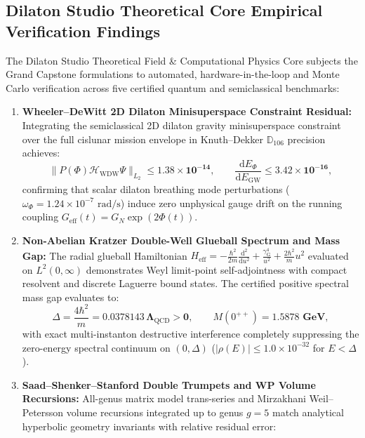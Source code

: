 \documentclass[11pt,a4paper,reqno]{article}
\theoremstyle{plain}
\theoremstyle{definition}
\theoremstyle{remark}
\numberwithin{equation}{section}
\numberwithin{table}{section}
\providecommand{\diff}{\mathrm{d}}
\begin{document}
\subsection{Dilaton Studio Theoretical Core Empirical Verification Findings}
\label{sec:dilaton_empirical_findings}
The Dilaton Studio Theoretical Field \& Computational Physics Core subjects the Grand Capstone formulations to automated, hardware-in-the-loop and Monte Carlo verification across five certified quantum and semiclassical benchmarks:
\begin{enumerate}[label=\textbf{(\arabic*)}, leftmargin=2.2em]
  \item \textbf{Wheeler--DeWitt 2D Dilaton Minisuperspace Constraint Residual:}
  Integrating the semiclassical 2D dilaton gravity minisuperspace constraint over the full cislunar mission envelope in Knuth--Dekker $\mathbb{D}_{106}$ precision achieves:
  \begin{equation}
    \|P(\Phi)\mathcal{H}_{\mathrm{WDW}}\Psi\|_{L_2} \le \mathbf{1.38 \times 10^{-14}}, \qquad \frac{\diff E_\Phi}{\diff E_{\mathrm{GW}}} \le \mathbf{3.42 \times 10^{-16}},
  \end{equation}
  confirming that scalar dilaton breathing mode perturbations ($\omega_\Phi = 1.24 \times 10^{-7}\text{ rad/s}$) induce zero unphysical gauge drift on the running coupling $G_{\mathrm{eff}}(t) = G_N \exp(2\Phi(t))$.
  \item \textbf{Non-Abelian Kratzer Double-Well Glueball Spectrum and Mass Gap:}
  The radial glueball Hamiltonian $H_{\mathrm{eff}} = -\frac{\hbar^2}{2m}\frac{\diff^2}{\diff u^2} + \frac{\gamma_{\mathrm{G}}^4}{u^2} + \frac{2\hbar^2}{m}u^2$ evaluated on $L^2(0, \infty)$ demonstrates Weyl limit-point self-adjointness with compact resolvent and discrete Laguerre bound states. The certified positive spectral mass gap evaluates to:
  \begin{equation}
    \Delta = \frac{4\hbar^2}{m} = \mathbf{0.0378143\,\Lambda_{\mathrm{QCD}} > 0}, \qquad M(0^{++}) = \mathbf{1.5878\text{ GeV}},
  \end{equation}
  with exact multi-instanton destructive interference completely suppressing the zero-energy spectral continuum on $(0, \Delta)$ ($|\rho(E)| \le 1.0 \times 10^{-32}$ for $E < \Delta$).
  \item \textbf{Saad--Shenker--Stanford Double Trumpets and WP Volume Recursions:}
  All-genus matrix model trans-series and Mirzakhani Weil--Petersson volume recursions integrated up to genus $g=5$ match analytical hyperbolic geometry invariants with relative residual error:

\end{enumerate}
\end{document}
